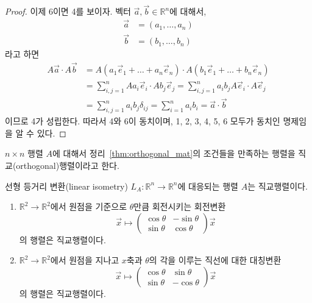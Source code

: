 \documentclass[sections/engineering_mathematics_lecture_note.tex]{subfiles}
\begin{document}
\begin{proof}
    이제 6이면 4를 보이자.
    벡터 $\vec a, \vec b \in \mathbb R^n$에 대해서,
    \begin{align*}
        \vec a &= (a_1, \dots, a_n)\\
        \vec b &= (b_1, \dots, b_n)
    \end{align*}
    라고 하면
    \begin{align*}
        A \vec a \cdot A \vec b &= A(a_1 \vec e_1 + \dots + a_n \vec e_n) \cdot A (b_1 \vec e_1 + \dots + b_n \vec e_n)\\
                                &= \sum_{i, j = 1}^n A a_i \vec e_i \cdot A b_j \vec e_j = \sum_{i, j = 1}^n a_i b_j A \vec e_i \cdot A \vec e_j\\
                                &= \sum_{i, j = 1}^n a_i b_j \delta_{ij} = \sum_{i = 1}^n a_i b_i = \vec a \cdot \vec b
    \end{align*}
    이므로 4가 성립한다.
    따라서 4와 6이 동치이며, 1, 2, 3, 4, 5, 6 모두가 동치인 명제임을 알 수 있다.
\end{proof}

\begin{definition} \label{def:orthogonal_mat}
    $n \times n$ 행렬 $A$에 대해서 정리~\ref{thm:orthogonal_mat}의 조건들을 만족하는 행렬을 직교(orthogonal)행렬이라고 한다.
\end{definition}

\begin{theorem}
    선형 등거리 변환(linear isometry) $L_A: \mathbb R^n \rightarrow \mathbb R^n$에 대응되는 행렬 $A$는 직교행렬이다.
\end{theorem}

\begin{example}
    \leavevmode
    \begin{enumerate}
        \item $\mathbb R^2 \rightarrow \mathbb R^2$에서 원점을 기준으로 $\theta$만큼 회전시키는 회전변환 
            \begin{equation*}
                \vec x \mapsto \begin{pmatrix}\cos \theta & -\sin \theta \\ \sin \theta & \cos \theta\end{pmatrix} \vec x
            \end{equation*}
        의 행렬은 직교행렬이다.
        \item $\mathbb R^2 \rightarrow \mathbb R^2$에서 원점을 지나고 $x$축과 $\theta$의 각을 이루는 직선에 대한 대칭변환 
            \begin{equation*}
                \vec x \mapsto \begin{pmatrix}\cos \theta & \sin \theta \\ \sin \theta & -\cos \theta\end{pmatrix} \vec x
            \end{equation*}
        의 행렬은 직교행렬이다.
    \end{enumerate}
\end{example}
\end{document}
